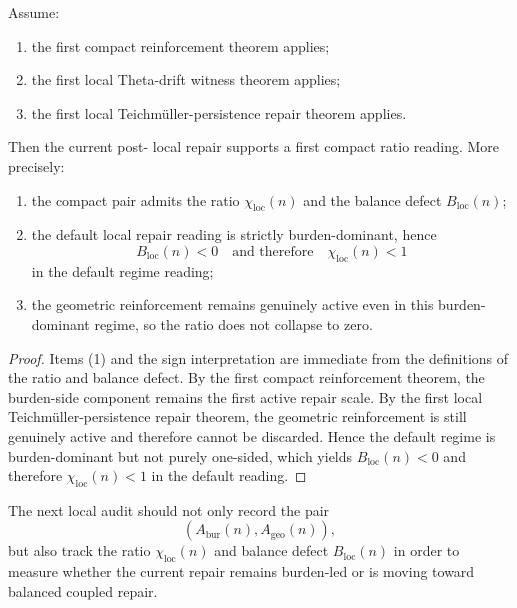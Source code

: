 \begin{theorem}
\label{thm:first-local-reinforcement-ratio-theorem}
Assume:
\begin{enumerate}[leftmargin=2em,label=(\alph*)]
 \item the first compact reinforcement theorem applies;
 \item the first local Theta-drift witness theorem applies;
 \item the first local Teichmüller-persistence repair theorem applies.
\end{enumerate}
Then the current post- local repair supports a first compact ratio reading.
More precisely:
\begin{enumerate}[leftmargin=2em,label=(\arabic*)]
 \item the compact pair admits the ratio $\chi_{\mathrm{loc}}(n)$ and the balance defect $B_{\mathrm{loc}}(n)$;
 \item the default local repair reading is strictly burden-dominant, hence
 \[
 B_{\mathrm{loc}}(n)<0
 \quad\text{and therefore}\quad
 \chi_{\mathrm{loc}}(n)<1
 \]
 in the default regime reading;
 \item the geometric reinforcement remains genuinely active even in this burden-dominant regime, so the ratio does not collapse to zero.
\end{enumerate}
\end{theorem}

\begin{proof}
Items (1) and the sign interpretation are immediate from the definitions of the ratio and balance defect.
By the first compact reinforcement theorem, the burden-side component remains the first active repair scale.
By the first local Teichmüller-persistence repair theorem, the geometric reinforcement is still genuinely active and therefore cannot be discarded.
Hence the default regime is burden-dominant but not purely one-sided, which yields $B_{\mathrm{loc}}(n)<0$ and therefore $\chi_{\mathrm{loc}}(n)<1$ in the default reading.
\end{proof}

\begin{corollary}
\label{cor:current-compact-ratio-working-rule}
The next local audit should not only record the pair
\[
 (A_{\mathrm{bur}}(n),A_{\mathrm{geo}}(n)),
\]
but also track the ratio $\chi_{\mathrm{loc}}(n)$ and balance defect $B_{\mathrm{loc}}(n)$ in order to measure whether the current repair remains burden-led or is moving toward balanced coupled repair.
\end{corollary}


